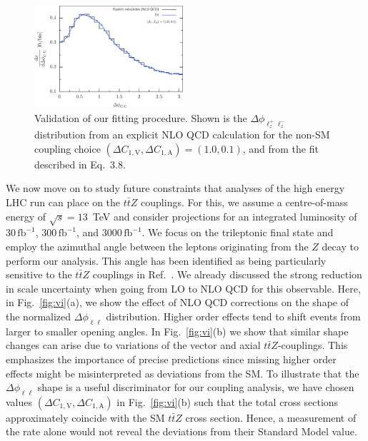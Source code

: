 \documentclass[preprint]{JHEP3}
\def\ttbZ{t\bar{t}Z}
\def\invfb {\mathrm{fb}^{-1}}
\def\DConeA{\Delta C_{1,\mathrm{A}}}
\def\DConeV{\Delta C_{1,\mathrm{V}}}
\begin{document}
\begin{figure}[t]
\centering %
\includegraphics[width=0.49\textwidth]{./LHC_53_Fig17d.eps}
\caption{\label{fig:iv} Validation of our fitting procedure. Shown is the $\Delta \phi_{\ell^+_z \ell^-_z}$ distribution from an explicit NLO QCD calculation 
for the non-SM coupling choice $(\DConeV,\DConeA)=(1.0,0.1)$, and from the fit described in Eq.~3.8. }
\end{figure}



We now move on to study future constraints that analyses of the high energy LHC run can place on the $\ttbZ$ couplings.
For this, we assume a centre-of-mass energy of $\sqrt{s}=13$~TeV and consider projections for an integrated luminosity of
$30\, \invfb$, $300\, \invfb$, and $3000\, \invfb$. 
We focus on the trileptonic final state and employ the azimuthal angle between the leptons originating
from the $Z$ decay to perform our analysis.
This angle has been identified as being particularly sensitive to the $\ttbZ$ couplings in Ref.~\cite{Baur:2004uw}.
We already discussed the strong reduction in scale uncertainty when going from LO to NLO QCD for this observable.
Here, in Fig.~\ref{fig:vi}(a), we show the effect of NLO QCD corrections on the shape of the normalized $\Delta \phi_{\ell\ell}$ distribution.
Higher order effects tend to shift events from larger to smaller opening angles.
In Fig.~\ref{fig:vi}(b) we show that similar shape changes can arise due to variations of the vector and axial $\ttbZ$-couplings.
This emphasizes the importance of precise predictions since missing higher order effects might be misinterpreted as deviations from the SM.
To illustrate that the $\Delta \phi_{\ell\ell}$ shape is a useful discriminator for our coupling analysis, we have chosen 
values $(\DConeV,\DConeA)$ in Fig.~\ref{fig:vi}(b) such that the total cross sections approximately coincide with the SM $\ttbZ$ cross section.
Hence, a measurement of the rate alone would not reveal the deviations from their Standard Model value.\\
 
\end{document}
